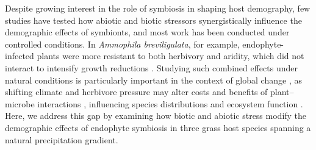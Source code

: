 \documentclass[12pt]{article}\usepackage[]{graphicx}\usepackage[dvipsnames]{xcolor}
\begin{document}
Despite growing interest in the role of symbiosis in shaping host demography, few studies have tested how abiotic and biotic stressors synergistically influence the demographic effects of symbionts, and most work has been conducted under controlled conditions.
In \emph{Ammophila breviligulata}, for example, endophyte-infected plants were more resistant to both herbivory and aridity, which did not interact to intensify growth reductions \citep{emery2010variation}.
Studying such combined effects under natural conditions is particularly important in the context of global change \citep{louthan2015and}, as shifting climate and herbivore pressure may alter costs and benefits of plant--microbe interactions \citep{rudgers2020climate}, influencing species distributions and ecosystem function \citep{reynolds2003grassroots}.
Here, we address this gap by examining how biotic and abiotic stress modify the demographic effects of endophyte symbiosis in three grass host species spanning a natural precipitation gradient.
\end{document}
